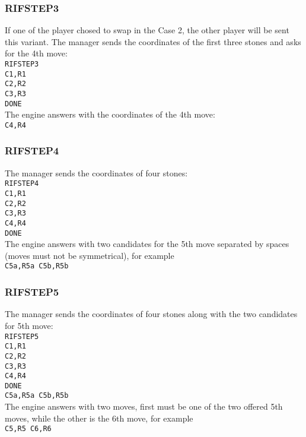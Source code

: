 \documentclass[12pt,a4paper]{article}
\begin{document}
\subsubsection{RIFSTEP3}
If one of the player chosed to swap in the Case 2, the other player will be sent this variant. The manager sends the coordinates of the first three stones and asks for the 4th move:\\
\texttt{RIFSTEP3}\\
\texttt{C1,R1}\\
\texttt{C2,R2}\\
\texttt{C3,R3}\\
\texttt{DONE}\\
The engine answers with the coordinates of the 4th move:\\
\texttt{C4,R4}

\subsubsection{RIFSTEP4}
The manager sends the coordinates of four stones:\\
\texttt{RIFSTEP4}\\
\texttt{C1,R1}\\
\texttt{C2,R2}\\
\texttt{C3,R3}\\
\texttt{C4,R4}\\
\texttt{DONE}\\
The engine answers with two candidates for the 5th move separated by spaces (moves must not be symmetrical), for example\\
\texttt{C5a,R5a C5b,R5b}

\subsubsection{RIFSTEP5}
The manager sends the coordinates of four stones along with the two candidates for 5th move:\\
\texttt{RIFSTEP5}\\
\texttt{C1,R1}\\
\texttt{C2,R2}\\
\texttt{C3,R3}\\
\texttt{C4,R4}\\
\texttt{DONE}\\
\texttt{C5a,R5a C5b,R5b}\\
The engine answers with two moves, first must be one of the two offered 5th moves, while the other is the 6th move, for example\\
\texttt{C5,R5 C6,R6}
\end{document}
